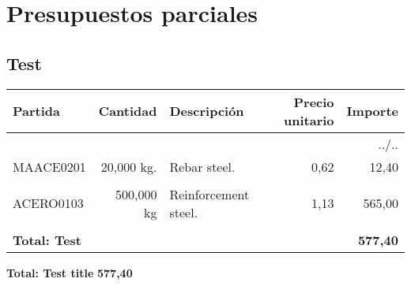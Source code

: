 \documentclass{book}%
\begin{document}
%
\normalsize%
\part{Presupuestos parciales}%
\chapter{Test}%
\small%
\begin{longtable}{lrlrr}%
Partida&Cantidad&Descripción&\multicolumn{1}{p{1.5cm}}{Precio unitario}&Importe\\%
\hline%
\endhead%
\multicolumn{5}{r}{../..}\\%
\endfoot%
\endlastfoot%
MAACE0201&    20,000 kg.&\multicolumn{1}{p{5cm}}{Rebar steel.}&      0,62&12,40\\%
&&&&\\%
ACERO0103&   500,000 kg&\multicolumn{1}{p{5cm}}{Reinforcement steel.}&      1,13&565,00\\%
&&&&\\%
\multicolumn{4}{p{8cm}}{\textbf{Total: Test}}&\textbf{577,40}\\%
\end{longtable}%
\normalsize

%
\noindent%
\large%
\textbf{Total: Test title }%
\dotfill%
\textbf{577,40}%
\newline%
\normalsize

%
\end{document}
